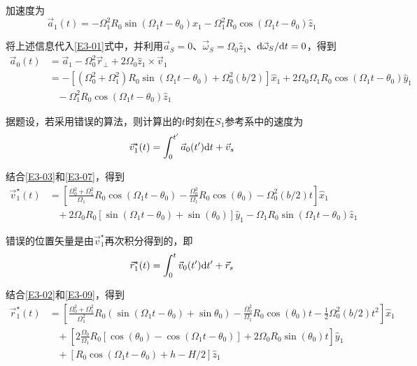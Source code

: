 \documentclass[10pt,a4paper,onecolumn,UTF8]{ctexart}
\begin{document}
	加速度为
	\begin{equation}
		\vec a_1(t)=-\Omega_1^2R_0\sin(\Omega_1t-\theta_0)\hat x_1-\Omega_1^2R_0\cos(\Omega_1t-\theta_0)\hat z_1
	\end{equation}
	
	将上述信息代入\eqref{E3-01}式中，并利用$\vec a_S=0$、$\vec \omega_S=\Omega_0\hat z_1$、$\mathrm{d}\vec\omega_S/\mathrm{d} t=0$，得到
	\begin{equation}\label{E3-07}
		\begin{aligned}
			\vec a_0(t)&=\vec a_1-\Omega_0^2\vec r_{\perp}+2\Omega_0\hat z_1\times \vec v_1\\
			&=-\left[(\Omega_0^2+\Omega_1^2)R_0\sin(\Omega_1t-\theta_0)+\Omega_0^2(b/2)\right]\hat x_1+2\Omega_0\Omega_1R_0\cos(\Omega_1t-\theta_0)\hat y_1\\&\,\,\,\,\,-\Omega_1^2R_0\cos(\Omega_1t-\theta_0)\hat z_1
		\end{aligned}
	\end{equation}
	
	据题设，若采用错误的算法，则计算出的$t$时刻在$S_1$参考系中的速度为
	\begin{equation}
		\vec v_1^{\star}(t)=\int_{0}^{t'}\vec a_0(t')\mathrm{d} t+\vec v_s
	\end{equation}
	
	结合\eqref{E3-03}和\eqref{E3-07}，得到
	\begin{equation}\label{E3-09}
		\begin{aligned}
			\vec v_1^{\star}(t)&=\left[\frac{\Omega_0^2+\Omega_1^2}{\Omega_1}R_0\cos(\Omega_1t-\theta_0)-\frac{\Omega_0^2}{\Omega_1}R_0\cos(\theta_0)-\Omega_0^2(b/2)t\right]\hat x_1\\
			&\,\,\,\,\,+2\Omega_0R_0\left[\sin(\Omega_1t-\theta_0)+\sin(\theta_0)\right]\hat y_1-\Omega_1R_0\sin(\Omega_1t-\theta_0)\hat z_1
		\end{aligned}
	\end{equation}
	
	错误的位置矢量是由$\vec v_1^{\star}$再次积分得到的，即
	\begin{equation}
		\vec r_1^{\star}(t)=\int_{0}^{t}\vec v_0(t')\mathrm{d} t'+\vec r_s
	\end{equation}
	
	结合\eqref{E3-02}和\eqref{E3-09}，得到
	\begin{equation}\label{E3-11}
		\begin{aligned}
			\vec r_1^{\star}(t)&=\left[\frac{\Omega_0^2+\Omega_1^2}{\Omega_1^2}R_0\left(\sin(\Omega_1t-\theta_0)+\sin\theta_0\right)-\frac{\Omega_0^2}{\Omega_1}R_0\cos(\theta_0)t-\frac1 2\Omega_0^2(b/2)t^2\right]\hat x_1\\
			&\,\,\,\,\,+\left[2\frac{\Omega_0}{\Omega_1}R_0[\cos(\theta_0)-\cos(\Omega_1t-\theta_0)]+2\Omega_0R_0\sin(\theta_0)t\right]\hat y_1\\
			&\,\,\,\,\,+\left[R_0\cos(\Omega_1t-\theta_0)+h-H/2\right]\hat z_1
		\end{aligned}
	\end{equation}
	
\end{document}
